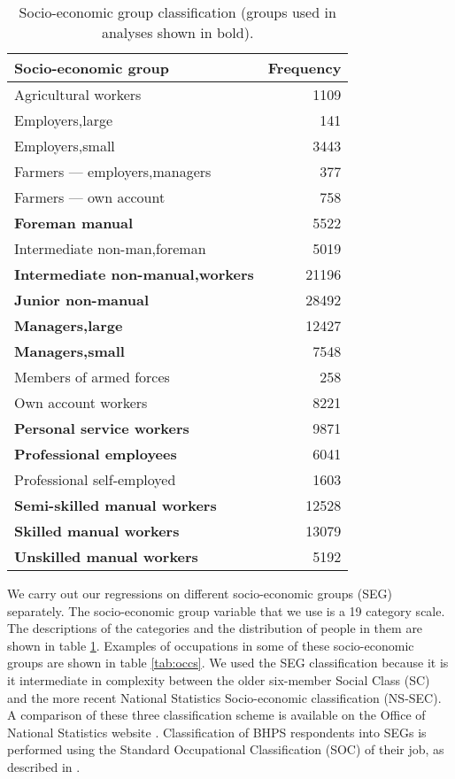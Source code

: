 \documentclass[a4paper,11pt,titlepage]{article}
\begin{document}
\begin{table}[htb]
\caption{Socio-economic group classification (groups used in analyses shown in bold).  \label{tab:SEG}}
\begin{center}
\begin{tabular}{lr}
\toprule
Socio-economic group & Frequency \\
\midrule
  Agricultural workers & 1109 \\
  Employers,large & 141 \\
  Employers,small & 3443 \\
  Farmers --- employers,managers & 377 \\
  Farmers --- own account & 758 \\
  \textbf{Foreman manual} & 5522 \\
  Intermediate non-man,foreman & 5019 \\
  \textbf{Intermediate non-manual,workers} & 21196 \\
  \textbf{Junior non-manual} & 28492 \\
  \textbf{Managers,large} & 12427 \\
  \textbf{Managers,small} & 7548 \\
  Members of armed forces & 258 \\
  Own account workers & 8221 \\
  \textbf{Personal service workers} & 9871 \\
  \textbf{Professional employees} & 6041 \\
  Professional self-employed & 1603 \\
  \textbf{Semi-skilled manual workers} & 12528 \\
  \textbf{Skilled manual workers} & 13079 \\
  \textbf{Unskilled manual workers} & 5192 \\
\bottomrule
\end{tabular}
\end{center}
\end{table}

We carry out our regressions on different socio-economic groups (SEG) separately. The socio-economic group variable that we use is a 19 category scale. The descriptions of the categories and the distribution of people in them are shown in table \ref{tab:SEG}. Examples of occupations in some of these socio-economic groups are shown in table \ref{tab:occs}. We used the SEG classification because it is it intermediate in complexity between the older six-member Social Class (SC) and the more recent National Statistics Socio-economic classification (NS-SEC).  A comparison of these three classification scheme is available on the Office of National Statistics website \citep{ONSnd}. Classification of BHPS respondents into SEGs is performed using the Standard Occupational Classification (SOC) of their job, as described in \citet{Taylor2010}.
\end{document}
